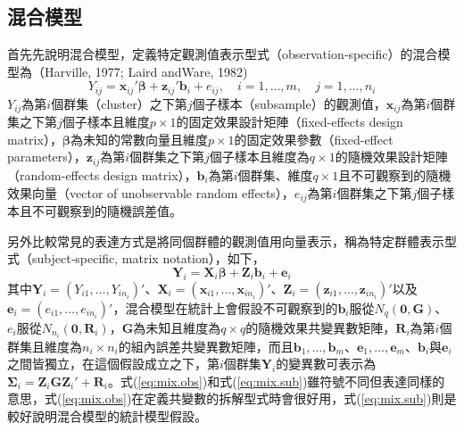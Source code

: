 \subsection{混合模型}
首先先說明混合模型，定義特定觀測值表示型式（observation‑specific）的混合模型為（Harville, 1977; Laird andWare, 1982)
\begin{equation}\label{eq:mix.obs}
Y_{ij}=\bm x_{ij}'\bm\beta+\bm z_{ij}'\bm b_i+e_{ij},\quad i=1, \ldots, m,\quad j=1, \ldots, n_i
\end{equation}
$Y_{ij}$為第$i$個群集（cluster）之下第$j$個子樣本（subsample）的觀測值，$\bm x_{ij}$為第$i$個群集之下第$j$個子樣本且維度$p\times1$的固定效果設計矩陣（fixed-effects design matrix），$\bm\beta$為未知的常數向量且維度$p\times1$的固定效果參數（fixed-effect parameters），$\bm z_{ij}$為第$i$個群集之下第$j$個子樣本且維度為$q\times 1$的隨機效果設計矩陣（random-effects design matrix），$\bm b_i$為第$i$個群集、維度$q\times1$且不可觀察到的隨機效果向量（vector of unobservable random effects），$e_{ij}$為第$i$個群集之下第$j$個子樣本且不可觀察到的隨機誤差值。\par
另外比較常見的表達方式是將同個群體的觀測值用向量表示，稱為特定群體表示型式（subject‑specific, matrix notation），如下，
\begin{equation}\label{eq:mix.sub}
\bm Y_i=\bm X_i\bm\beta+\bm Z_i\bm b_i+\bm e_i
\end{equation}
其中$\bm Y_i=(Y_{i1},\ldots,Y_{in_i})'$、$\bm X_i=(\bm x_{i1},\ldots,\bm x_{in_i})'$、$\bm Z_i=(\bm z_{i1},\ldots,\bm z_{in_i })'$以及$\bm e_i=(e_{i1},\ldots,e_{in_i})'$，混合模型在統計上會假設不可觀察到的$\bm b_i$服從$N_q (\bm 0,\bm G)$、$e_i$服從$N_{n_i} (\bm 0,\bm R_i)$，$\bm G$為未知且維度為$q\times q$的隨機效果共變異數矩陣，$\bm R_i$為第$i$個群集且維度為$n_i\times n_i$的組內誤差共變異數矩陣，而且$\bm b_1,\ldots,\bm b_m$、$\bm e_1,\ldots,\bm e_m$、$\bm b_i$與$\bm e_i$之間皆獨立，在這個假設成立之下，第$i$個群集$\bm Y_i$的變異數可表示為$\bm \Sigma_i=\bm Z_i\bm G\bm Z_i'+\bm R_i$。式(\ref{eq:mix.obs})和式(\ref{eq:mix.sub})雖符號不同但表達同樣的意思，式(\ref{eq:mix.obs})在定義共變數的拆解型式時會很好用，式(\ref{eq:mix.sub})則是較好說明混合模型的統計模型假設。\par

